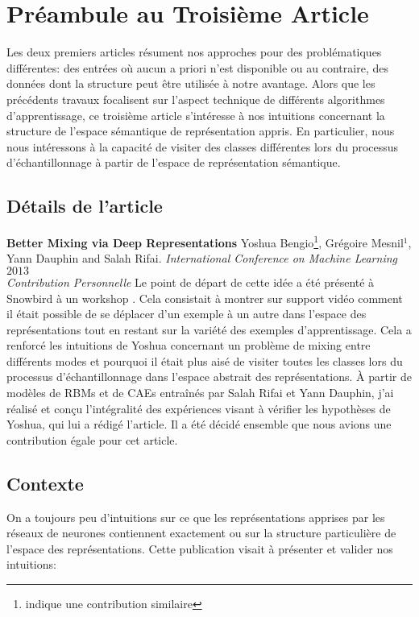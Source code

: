 \chapter{Pr\'{e}ambule au Troisi\`{e}me Article }

Les deux premiers articles résument nos approches pour des problématiques
différentes: des entrées où aucun a priori n'est disponible ou au contraire,
des données dont la structure peut être utilisée à notre avantage. Alors que
les précédents travaux focalisent sur l'aspect technique de différents
algorithmes d'apprentissage, ce troisième article s'intéresse à nos intuitions
concernant la structure de l'espace sémantique de représentation appris. En particulier, nous
nous intéressons à la capacité de visiter des classes différentes lors du
processus d'échantillonnage à partir de l'espace de représentation sémantique.

\section{D\'{e}tails de l'article}

{\bf Better Mixing via Deep Representations} Yoshua Bengio\footnote{indique une contribution similaire}, Grégoire Mesnil$^{1}$, Yann Dauphin and Salah Rifai. {\it
International Conference on Machine Learning} $2013$\\

{\it Contribution Personnelle} Le point de départ de cette idée a été présenté
à Snowbird à un workshop \citep{Mesnil-et-al-LW2012}. Cela consistait à montrer
sur support vidéo comment il était possible de se déplacer d'un exemple à un
autre dans l'espace des représentations tout en restant sur la variété des
exemples d'apprentissage. Cela a renforcé les intuitions de Yoshua concernant
un problème de mixing entre différents modes et pourquoi il était plus aisé
de visiter toutes les classes lors du processus d'échantillonnage dans l'espace
abstrait des représentations. À partir de modèles de RBMs et de CAEs entraînés
par Salah Rifai et Yann Dauphin, j'ai réalisé et conçu l'intégralité des
expériences visant à vérifier les hypothèses de Yoshua, qui lui a rédigé
l'article. Il a été décidé ensemble que nous avions une contribution égale pour
cet article.

\section{Contexte}

On a toujours peu d'intuitions sur ce que les représentations apprises par les
réseaux de neurones contiennent exactement ou sur la structure particulière de
l'espace des représentations. Cette publication visait à présenter et valider nos intuitions:

